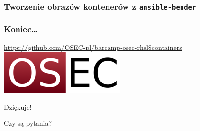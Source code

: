 \documentclass[dvipsnames,table]{beamer}
\begin{document}
\begin{frame}[fragile]
	\frametitle{Tworzenie obrazów kontenerów z {\tt ansible-bender}}
%
\end{frame}

\begin{frame}
\frametitle{Koniec\ldots}
\begin{center}
\href{https://github.com/OSEC-pl/barcamp-osec-rhel8containers}{https://github.com/OSEC-pl/barcamp-osec-rhel8containers}
\includegraphics[scale=0.5]{img-oseclogo.png}

Dziękuje!

Czy są pytania?

\end{center}
\end{frame}
\end{document}
